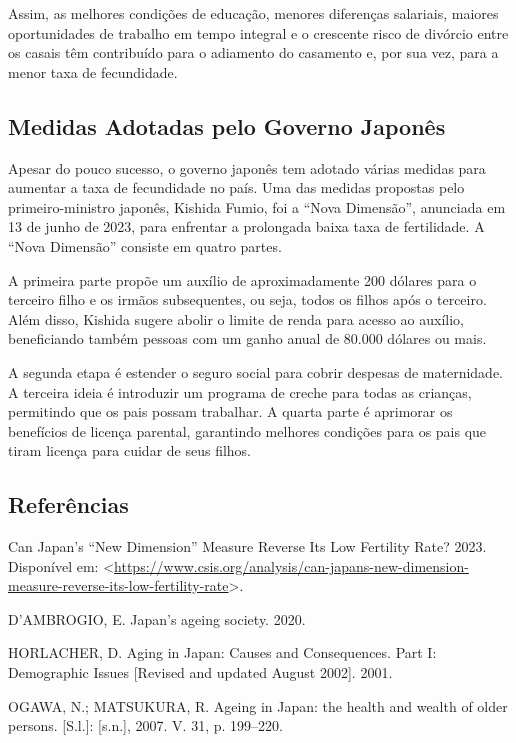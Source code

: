 \documentclass[
  12pt,
  letterpaper,
  DIV=11,
  numbers=noendperiod]{scrartcl}
\newlength{\cslhangindent}
\newenvironment{CSLReferences}[2] %
 {\begin{list}{}{%
  \setlength{\itemindent}{0pt}
  \setlength{\leftmargin}{0pt}
  \setlength{\parsep}{0pt}
  \ifodd #1
   \setlength{\leftmargin}{\cslhangindent}
   \setlength{\itemindent}{-1\cslhangindent}
  \fi
  \setlength{\itemsep}{#2\baselineskip}}}
 {\end{list}}
\begin{document}
\vspace{12pt}

Assim, as melhores condições de educação, menores diferenças salariais,
maiores oportunidades de trabalho em tempo integral e o crescente risco
de divórcio entre os casais têm contribuído para o adiamento do
casamento e, por sua vez, para a menor taxa de fecundidade.

\subsection{Medidas Adotadas pelo Governo
Japonês}\label{medidas-adotadas-pelo-governo-japonuxeas}

Apesar do pouco sucesso, o governo japonês tem adotado várias medidas
para aumentar a taxa de fecundidade no país. Uma das medidas propostas
pelo primeiro-ministro japonês, Kishida Fumio, foi a ``Nova Dimensão'',
anunciada em 13 de junho de 2023, para enfrentar a prolongada baixa taxa
de fertilidade. A ``Nova Dimensão'' consiste em quatro partes.

\vspace{12pt}

A primeira parte propõe um auxílio de aproximadamente 200 dólares para o
terceiro filho e os irmãos subsequentes, ou seja, todos os filhos após o
terceiro. Além disso, Kishida sugere abolir o limite de renda para
acesso ao auxílio, beneficiando também pessoas com um ganho anual de
80.000 dólares ou mais.

\vspace{12pt}

A segunda etapa é estender o seguro social para cobrir despesas de
maternidade. A terceira ideia é introduzir um programa de creche para
todas as crianças, permitindo que os pais possam trabalhar. A quarta
parte é aprimorar os benefícios de licença parental, garantindo melhores
condições para os pais que tiram licença para cuidar de seus filhos.

\subsection{Referências}\label{referuxeancias}

\label{refs}
\begin{CSLReferences}{0}{1}
Can Japan's {``New Dimension''} Measure Reverse Its Low Fertility Rate?
2023. Disponível em:
\textless{}\url{https://www.csis.org/analysis/can-japans-new-dimension-measure-reverse-its-low-fertility-rate}\textgreater.

D'AMBROGIO, E. Japan's ageing society. 2020.

HORLACHER, D. Aging in Japan: Causes and Consequences. Part I:
Demographic Issues {[}Revised and updated August 2002{]}. 2001.

OGAWA, N.; MATSUKURA, R. Ageing in Japan: the health and wealth of older
persons. {[}S.l.{]}: {[}s.n.{]}, 2007. V. 31, p. 199--220.

\end{CSLReferences}
\end{document}
